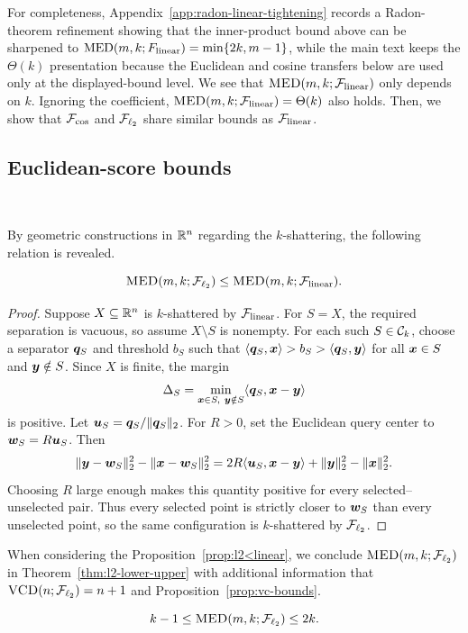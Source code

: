 \documentclass{article}
\begin{document}
For completeness, Appendix~\ref{app:radon-linear-tightening} records a Radon-theorem refinement showing that the inner-product bound above can be sharpened to
\(\mathrm{MED}(m,k;F_{\rm linear})=\min\{2k,m-1\}\), while the main text keeps the \(\Theta(k)\) presentation because the Euclidean and cosine transfers below are used only at the displayed-bound level.
We see that $\textsc{MED}(m, k; \mathcal{F}_{\rm linear})$ only depends on $k$. Ignoring the coefficient, $\textsc{MED}(m, k; \mathcal{F}_{\rm linear}) = \Theta(k)$ also holds. Then, we show that $\mathcal{F}_{\cos}$ and $\mathcal{F}_{\ell_{2}}$ share similar bounds as $\mathcal{F}_{\rm linear}$.

\subsection{Euclidean-score bounds}~\label{sec:generalize_linear}

By geometric constructions in $\mathbb{R}^n$ regarding the $k$-shattering, the following relation is revealed.

\begin{proposition}\label{prop:l2<linear}

$$\textsc{MED}(m, k; \mathcal{F}_{\ell_{2}}) \leq \textsc{MED}(m, k; \mathcal{F}_{\rm linear}). $$

\end{proposition}
\begin{proof}
Suppose $X\subseteq\mathbb{R}^n$ is $k$-shattered by $\mathcal{F}_{\rm linear}$. For $S=X$, the required separation is vacuous, so assume $X\setminus S$ is nonempty. For each such $S\in\mathcal{C}_k$, choose a separator $\bm{q}_S$ and threshold $b_S$ such that $\langle \bm{q}_S,\bm{x}\rangle>b_S>\langle \bm{q}_S,\bm{y}\rangle$ for all $\bm{x}\in S$ and $\bm{y}\notin S$. Since $X$ is finite, the margin
\[
    \Delta_S=\min_{\bm{x}\in S,\ \bm{y}\notin S}
    \langle \bm{q}_S,\bm{x}-\bm{y}\rangle
\]
is positive. Let $\bm{u}_S=\bm{q}_S/\|\bm{q}_S\|_2$. For $R>0$, set the Euclidean query center to $\bm{w}_S=R\bm{u}_S$. Then
\[
    \|\bm{y}-\bm{w}_S\|_2^2-\|\bm{x}-\bm{w}_S\|_2^2
    =
    2R\langle \bm{u}_S,\bm{x}-\bm{y}\rangle+\|\bm{y}\|_2^2-\|\bm{x}\|_2^2 .
\]
Choosing $R$ large enough makes this quantity positive for every selected--unselected pair. Thus every selected point is strictly closer to $\bm{w}_S$ than every unselected point, so the same configuration is $k$-shattered by $\mathcal{F}_{\ell_{2}}$.
\end{proof}
When considering the Proposition~\ref{prop:l2<linear}, we conclude $\textsc{MED}(m, k;\mathcal{F}_{\ell_{2}})$ in Theorem~\ref{thm:l2-lower-upper} with additional information that $\textsc{VCD}(n;\mathcal{F}_{\ell_{2}}) = n+1$ and Proposition~\ref{prop:vc-bounds}.

\begin{theorem}\label{thm:l2-lower-upper}
    $$k-1\leq \textsc{MED}(m, k; \mathcal{F}_{\ell_{2}}) \leq 2k.$$
\end{theorem}
\end{document}
